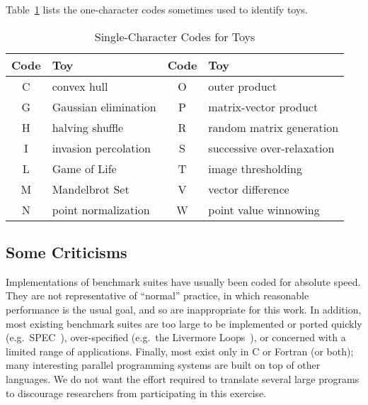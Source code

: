 
Table~\ref{t:toy-codes} lists the one-character codes sometimes used to identify toys.

\begin{table}
\begin{center}
\begin{tabular}{cl|cl}
Code	& Toy				& Code	& Toy				\\
\hline
C	& convex hull			& O	& outer product			\\
G	& Gaussian elimination		& P	& matrix-vector product		\\
H	& halving shuffle		& R	& random matrix generation	\\
I	& invasion percolation		& S	& successive over-relaxation	\\
L	& Game of Life			& T	& image thresholding		\\
M	& Mandelbrot Set		& V	& vector difference		\\
N	& point normalization		& W	& point value winnowing
\end{tabular}
\caption{Single-Character Codes for Toys\label{t:toy-codes}}
\end{center}
\end{table}


\subsection{Some Criticisms\label{s:method-criticism}}


Implementations of benchmark suites have usually been coded for absolute speed.
They are not representative of ``normal'' practice,
in which reasonable performance is the usual goal,
and so are inappropriate for this work.
In addition,
most existing benchmark suites are too large to be implemented or ported quickly
(e.g.\ SPEC~\cite{b:bench-over}),
over-specified (e.g.\ the Livermore Loops~\cite{b:livermore-loops}),
or concerned with a limited range of applications.
Finally,
most exist only in C or Fortran (or both);
many interesting parallel programming systems are built on top of other languages.
We do not want the effort required to translate several large programs
to discourage researchers from participating in this exercise.

